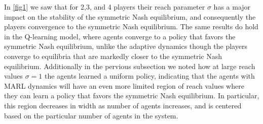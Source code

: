 \documentclass{article}
\begin{document}
                In \cref{fig1} we saw that for 2,3, and 4 players their reach parameter $\sigma$ has a major impact on the stability of the symmetric Nash equilibrium, and consequently the players convergence to the symmetric Nash equilibrium. The same results do hold in the Q-learning model, where agents converge to a policy that favors the symmetric Nash equilibrium, unlike the adaptive dynamics though the players converge to equilibria that are markedly closer to the symmetric Nash equilibrium. Additionally in the pervious subsection we noted how at large reach values $\sigma =1$ the agents learned a uniform policy, indicating that the agents with MARL dynamics will have an even more limited region of reach values where they can learn a policy that favors the symmetric Nash equilibrium. In particular, this region decreases in width as number of agents increases, and is centered based on the particular number of agents in the system.  
    
\end{document}
